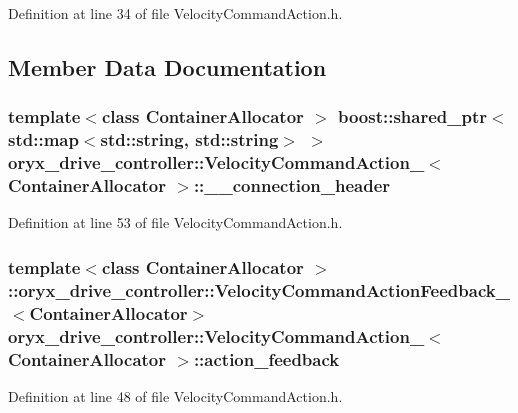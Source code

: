 \-Definition at line 34 of file \-Velocity\-Command\-Action.\-h.



\subsection{\-Member \-Data \-Documentation}
\subsubsection[{\-\_\-\-\_\-connection\-\_\-header}]{\setlength{\rightskip}{0pt plus 5cm}template$<$class Container\-Allocator $>$ boost\-::shared\-\_\-ptr$<$std\-::map$<$std\-::string, std\-::string$>$ $>$ {\bf oryx\-\_\-drive\-\_\-controller\-::\-Velocity\-Command\-Action\-\_\-}$<$ \-Container\-Allocator $>$\-::{\bf \-\_\-\-\_\-connection\-\_\-header}}\label{structoryx__drive__controller_1_1VelocityCommandAction___abcb3b24d5b3b834d09d3bf797641d7f8}


\-Definition at line 53 of file \-Velocity\-Command\-Action.\-h.

\subsubsection[{action\-\_\-feedback}]{\setlength{\rightskip}{0pt plus 5cm}template$<$class Container\-Allocator $>$ \-::{\bf oryx\-\_\-drive\-\_\-controller\-::\-Velocity\-Command\-Action\-Feedback\-\_\-}$<$\-Container\-Allocator$>$ {\bf oryx\-\_\-drive\-\_\-controller\-::\-Velocity\-Command\-Action\-\_\-}$<$ \-Container\-Allocator $>$\-::{\bf action\-\_\-feedback}}\label{structoryx__drive__controller_1_1VelocityCommandAction___a537fa447f79964dae6efe4e0515a6544}


\-Definition at line 48 of file \-Velocity\-Command\-Action.\-h.

